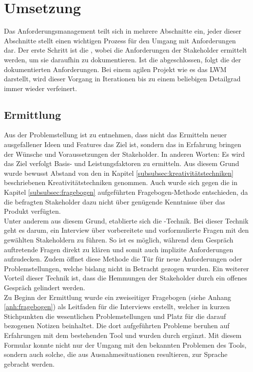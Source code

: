 \chapter{Umsetzung}
Das Anforderungsmanagement teilt sich in mehrere Abschnitte ein, jeder dieser Abschnitte stellt einen wichtigen Prozess für den Umgang mit Anforderungen dar. Der erste Schritt ist die , wobei die Anforderungen der Stakeholder ermittelt werden, um sie daraufhin zu dokumentieren. Ist die  abgeschlossen, folgt die  der dokumentierten Anforderungen. Bei einem agilen Projekt wie es das \ac{LWM} darstellt, wird dieser Vorgang in Iterationen bis zu einem beliebigen Detailgrad immer wieder verfeinert.

\section{Ermittlung}
\label{sec:ermittlung}

Aus der Problemstellung ist zu entnehmen, dass nicht das Ermitteln neuer ausgefallener Ideen und Features das Ziel ist, sondern das in Erfahrung bringen der Wünsche und Voraussetzungen der Stakeholder. In anderen Worten: Es wird das Ziel verfolgt Basis- und Leistungsfaktoren zu ermitteln. Aus diesem Grund wurde bewusst Abstand von den in Kapitel \ref{subsubsec:kreativitätstechniken} beschriebenen Kreativitätstechniken genommen. Auch wurde sich gegen die in Kapitel \ref{subsubsec:fragebogen} aufgeführten Fragebogen-Methode entschieden, da die befragten Stakeholder dazu nicht über genügende Kenntnisse über das Produkt verfügten.\\

Unter anderem aus diesem Grund, etablierte sich die -Technik. Bei dieser Technik geht es darum, ein Interview über vorbereitete und vorformulierte Fragen mit den gewählten Stakeholdern zu führen. So ist es möglich, während dem Gespräch auftretende Fragen direkt zu klären und somit auch implizite Anforderungen aufzudecken. Zudem öffnet diese Methode die Tür für neue Anforderungen oder Problemstellungen, welche bislang nicht in Betracht gezogen wurden. 
Ein weiterer Vorteil dieser Technik ist, dass die Hemmungen der Stakeholder durch ein offenes Gespräch gelindert werden.\\

Zu Beginn der Ermittlung wurde ein zweiseitiger Fragebogen (siehe Anhang \ref{anh:fragebogen}) als Leitfaden für die Interviews erstellt, welcher in kurzen Stichpunkten die wesentlichen Problemstellungen und Platz für die darauf bezogenen Notizen beinhaltet. Die dort aufgeführten Probleme beruhen auf Erfahrungen mit dem bestehenden Tool und wurden durch   ergänzt. 
Mit diesem Formular konnte nicht nur der Umgang mit den bekannten Problemen des Tools, sondern auch solche, die aus Ausnahmesituationen resultieren, zur Sprache gebracht werden.\\

